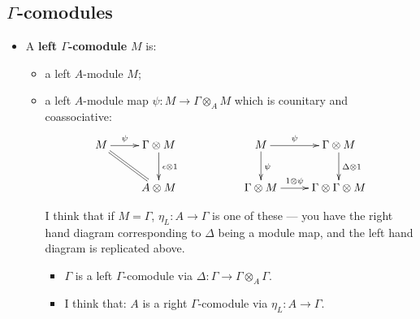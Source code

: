 \documentclass[11pt]{article}
\begin{document}
\begin{Gamma-comodules}
\section*{$\Gamma$-comodules}

\begin{itemize}\squishlist
\item A \textbf{left $\Gamma$-comodule} $M$ is:
\begin{itemize}\squishlist
\item a left $A$-module $M$;
\item a left $A$-module map $\psi:M\to\Gamma\otimes_A M$ which is counitary and coassociative:
\[\xymatrix{
M\ar[r]^-{\psi}&\Gamma\otimes M\ar[d]^{\epsilon\otimes1}&&
M\ar[d]^{\psi}\ar[r]^-{\psi}&\Gamma\otimes M\ar[d]^{\Delta\otimes1}\\
&A\otimes M\ar@{=}[ul]&&
\Gamma\otimes M\ar[r]^-{1\otimes\psi}& \Gamma\otimes\Gamma\otimes M
}\]
\begin{shaded}
I think that if $M=\Gamma$, $\eta_L:A\to \Gamma$ is one of these --- you have the right hand diagram corresponding to $\Delta$ being a module map, and the left hand diagram is replicated above.
\begin{itemize}\squishlist
\item $\Gamma$ is a left $\Gamma$-comodule via $\Delta:\Gamma\to\Gamma\otimes_A\Gamma$.
\item I think that: $A$ is a right $\Gamma$-comodule via $\eta_L:A\to\Gamma$.
\end{itemize}

\end{shaded}


\end{itemize}
\end{itemize}
\end{Gamma-comodules}
\end{document}
